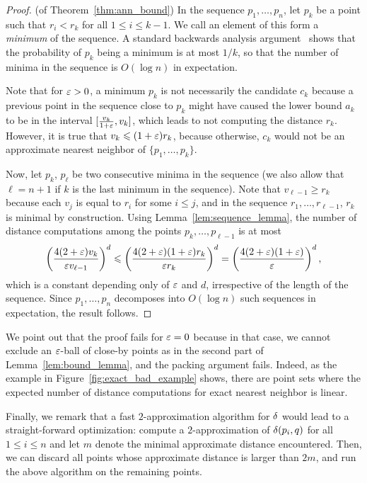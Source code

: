 \documentclass[a4paper,UKenglish,cleveref, autoref]{lipics-v2019}
\begin{document}
\begin{proof} (of Theorem~\ref{thm:ann_bound})
%
In the sequence $p_1,\ldots,p_n$, let $p_k$ be a point 
such that $r_i<r_k$ for all $1\leq i\leq k-1$. We call an element
of this form a \emph{minimum} of the sequence. 
A standard backwards analysis argument~\cite{seidel-backwards} shows that the probability
of $p_k$ being a minimum is at most $1/k$, so that the number of minima
in the sequence is $O(\log n)$ in expectation.

Note that for $\varepsilon>0$,
a minimum $p_k$ is not necessarily the candidate $c_k$ because a previous point
in the sequence close to $p_k$ might have caused the lower bound $a_k$ to be
in the interval $[\frac{v_k}{1+\varepsilon},v_k]$, which leads to not
computing the distance $r_k$. However, it is true that
$v_k\leqslant (1+\varepsilon)r_k$, because otherwise, $c_k$ would not be an approximate
nearest neighbor of $\{p_1,\ldots,p_k\}$.

Now, let $p_k$, $p_\ell$ be two consecutive minima in the sequence
(we also allow that $\ell=n+1$ if $k$ is the last minimum in the sequence).
Note that $v_{\ell-1}\geq r_k$ because each $v_j$ is equal to $r_i$ for
some $i\leq j$, and in the sequence $r_1,\ldots,r_{\ell-1}$, $r_k$
is minimal by construction. Using Lemma~\ref{lem:sequence_lemma},
the number of distance computations among the points
$p_k,\ldots,p_{\ell-1}$ is at most
\[
\left(\frac{4(2+\varepsilon) v_k}{\varepsilon v_{\ell-1}}\right)^{d}\leqslant \left(\frac{4(2+\varepsilon)(1+\varepsilon)r_k}{\varepsilon r_k}\right)^{d}=\left(\frac{4(2+\varepsilon)(1+\varepsilon)}{\varepsilon}\right)^{d},\]
which is a constant depending only of $\varepsilon$ and $d$, irrespective of the length of the sequence.
Since $p_1,\ldots,p_n$ decomposes into $O(\log n)$ such sequences in expectation, the result follows.
\end{proof}

We point out that the proof fails for $\varepsilon=0$ because in that case, we cannot exclude an $\varepsilon$-ball
of close-by points as in the second part of Lemma~\ref{lem:bound_lemma}, and the packing argument fails.
Indeed, as the example in Figure~\ref{fig:exact_bad_example} shows, there are point sets where the expected number
of distance computations for exact nearest neighbor is linear.



Finally, we remark that a fast $2$-approximation algorithm for $\delta$ would lead to a straight-forward
optimization: compute a $2$-approximation of $\delta(p_i,q)$ for all $1\leq i\leq n$
and let $m$ denote the minimal approximate distance encountered. Then, we can discard all points
whose approximate distance is larger than $2m$, and run the above algorithm on the remaining points.
\end{document}
